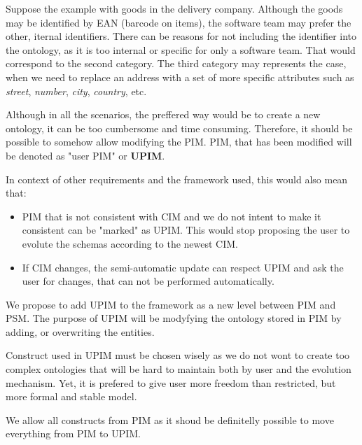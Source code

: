 Suppose the example with goods in the delivery company. Although the goods may be identified by EAN (barcode on items), the software team may prefer the other, iternal identifiers. There can be reasons for not including the identifier into the ontology, as it is too internal or specific for only a software team. That would correspond to the second category. The third category may represents the case, when we need to replace an address with a set of more specific attributes such as \textit{street}, \textit{number}, \textit{city}, \textit{country}, etc.

Although in all the scenarios, the preffered way would be to create a new ontology, it can be too cumbersome and time consuming. Therefore, it should be possible to somehow allow modifying the PIM. PIM, that has been modified will be denoted as "user PIM" or \textbf{UPIM}.

\bigskip

In context of other requirements and the framework used, this would also mean that:
\begin{itemize}
    \item PIM that is not consistent with CIM and we do not intent to make it consistent can be "marked" as UPIM. This would stop proposing the user to evolute the schemas according to the newest CIM.
    \item If CIM changes, the semi-automatic update can respect UPIM and ask the user for changes, that can not be performed automatically.
\end{itemize}

We propose to add UPIM to the framework as a new level between PIM and PSM. The purpose of UPIM will be modyfying the ontology stored in PIM by adding, or overwriting the entities.

Construct used in UPIM must be chosen wisely as we do not wont to create too complex ontologies that will be hard to maintain both by user and the evolution mechanism. Yet, it is prefered to give user more freedom than restricted, but more formal and stable model.

We allow all constructs from PIM as it shoud be definitelly possible to move everything from PIM to UPIM.